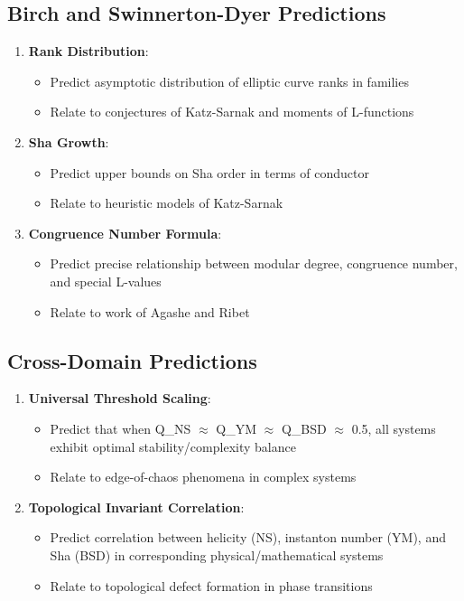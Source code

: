 \documentclass[11pt]{article}
\begin{document}
\subsection{Birch and Swinnerton-Dyer Predictions}
\begin{enumerate}
\item \textbf{Rank Distribution}:
  \begin{itemize}
  \item Predict asymptotic distribution of elliptic curve ranks in families
  \item Relate to conjectures of Katz-Sarnak and moments of L-functions
  \end{itemize}
\item \textbf{Sha Growth}:
  \begin{itemize}
  \item Predict upper bounds on Sha order in terms of conductor
  \item Relate to heuristic models of Katz-Sarnak
  \end{itemize}
\item \textbf{Congruence Number Formula}:
  \begin{itemize}
  \item Predict precise relationship between modular degree, congruence number, and special L-values
  \item Relate to work of Agashe and Ribet
  \end{itemize}
\end{enumerate}

\subsection{Cross-Domain Predictions}
\begin{enumerate}
\item \textbf{Universal Threshold Scaling}:
  \begin{itemize}
  \item Predict that when Q\_NS $\approx$ Q\_YM $\approx$ Q\_BSD $\approx$ 0.5, all systems exhibit optimal stability/complexity balance
  \item Relate to edge-of-chaos phenomena in complex systems
  \end{itemize}
\item \textbf{Topological Invariant Correlation}:
  \begin{itemize}
  \item Predict correlation between helicity (NS), instanton number (YM), and Sha (BSD) in corresponding physical/mathematical systems
  \item Relate to topological defect formation in phase transitions
  \end{itemize}
\end{enumerate}
\end{document}
